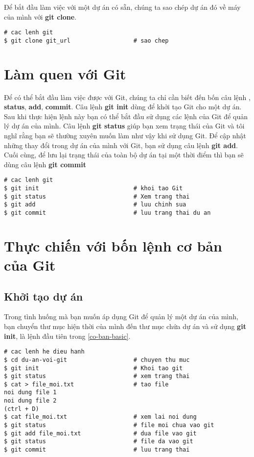 \documentclass[12pt]{article}
\begin{document}
Để bắt đầu làm việc với một dự án có sẵn, chúng ta sao chép dự án đó về máy của mình với \textbf{git clone}.

\begin{lstlisting}[label=sao-chep-clone,caption=Sao chép]
# cac lenh git
$ git clone git_url                  # sao chep
\end{lstlisting}

\section{Làm quen với Git}
Để có thể bắt đầu làm việc được với Git, chúng ta chỉ cần biết đến bốn câu lệnh , \textbf{status}, \textbf{add}, \textbf{commit}. Câu lệnh \textbf{git init} dùng để khởi tạo Git cho một dự án. Sau khi thực hiện lệnh này bạn có thể bắt đầu sử dụng các lệnh của Git để quản lý dự án của mình. Câu lệnh \textbf{git status} giúp bạn xem trạng thái của Git và tôi nghĩ rằng bạn sẽ thường xuyên muốn làm như vậy khi sử dụng Git. Để cập nhật những thay đổi trong dự án của mình với Git, bạn sử dụng câu lệnh \textbf{git add}. Cuối cùng, để lưu lại trạng thái của toàn bộ dự án tại một thời điểm thì bạn sẽ dùng câu lệnh \textbf{git commit}

\begin{lstlisting}[label=co-ban-basic,caption=Bốn lệnh cơ bản]
# cac lenh git
$ git init                           # khoi tao Git
$ git status                         # Xem trang thai
$ git add                            # luu chinh sua 
$ git commit                         # luu trang thai du an
\end{lstlisting}

\section{Thực chiến với bốn lệnh cơ bản của Git}
\subsection{Khởi tạo dự án}
Trong tình huống mà bạn muốn áp dụng Git để quản lý một dự án của mình, bạn chuyển thư mục hiện thời của mình đến thư mục chứa dự án và sử dụng \textbf{git init}, là lệnh đầu tiên trong \ref{co-ban-basic}.

\begin{lstlisting}[label=tinh-huong-co-ban-basic-situation,caption=Bốn lệnh cơ bản]
# cac lenh he dieu hanh
$ cd du-an-voi-git                   # chuyen thu muc
$ git init                           # Khoi tao git
$ git status                         # xem trang thai
$ cat > file_moi.txt                 # tao file
noi dung file 1
noi dung file 2
(ctrl + D)
$ cat file_moi.txt                   # xem lai noi dung
$ git status                         # file moi chua vao git
$ git add file_moi.txt               # dua file vao git
$ git status                         # file da vao git
$ git commit                         # luu trang thai
\end{lstlisting}
\end{document}
